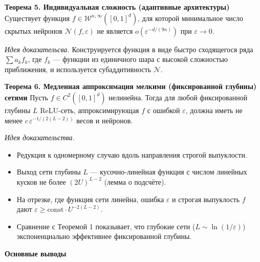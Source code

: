 \documentclass[12pt]{article}
\begin{document}
\vspace{5mm}
	\textbf{Теорема 5. Индивидуальная сложность (адаптивные архитектуры)} Существует функция \(f\in\mathcal{W}^{n,\infty}([0,1]^d)\), для которой минимальное число скрытых нейронов \(\mathcal{N}(f,\varepsilon)\) не является \(o(\varepsilon^{-d/(9n)})\) при \(\varepsilon\to0\).
	
	\emph{Идея доказательсва. } Конструируется функция в виде быстро сходящегося ряда \(\sum a_k f_k\), где \(f_k\) — функции из единичного шара с высокой сложностью приближения, и используется субаддитивность \(\mathcal{N}\).
	\vspace{5mm}
	
	\textbf{Теорема 6. Медленная аппроксимация мелкими (фиксированной глубины) сетями} Пусть \(f\in C^2([0,1]^d)\) нелинейна. Тогда для любой фиксированной глубины \(L\) ReLU-сеть, аппроксимирующая \(f\) с ошибкой \(\varepsilon\), должна иметь не менее \(c\,\varepsilon^{-1/(2(L-2))}\) весов и нейронов.
	
	\emph{Идея доказательства. }  
	\begin{itemize}
		\item Редукция к одномерному случаю вдоль направления строгой выпуклости.
		\item Выход сети глубины \(L\) — кусочно-линейная функция с числом линейных кусков не более \((2U)^{L-2}\) (лемма о подсчёте).
		\item На отрезке, где функция сети линейна, ошибка \(\varepsilon\) и строгая выпуклость \(f\) дают \(\varepsilon \ge \text{const}\cdot U^{-2(L-2)}\).
		\item Сравнение с Теоремой 1 показывает, что глубокие сети (\(L\sim\ln(1/\varepsilon)\)) экспоненциально эффективнее фиксированной глубины.
	\end{itemize}
	
	\textbf{Основные выводы}
	\vspace{5mm}
	
\end{document}
